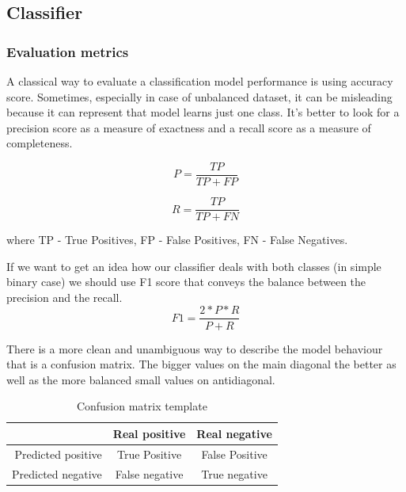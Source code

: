 \documentclass[11pt]{article}
\begin{document}
\subsection{Classifier}
\label{subsec:classifying2}

\subsubsection{Evaluation metrics}

A classical way to evaluate a classification model performance is using accuracy score. Sometimes, especially in case of unbalanced dataset, it can be misleading because it can represent that model learns just one class. It’s better to look for a precision score as a measure of exactness and a recall score as a measure of completeness.

\begin{equation}
P = \frac{TP}{TP+FP} 
\end{equation}

\begin{equation}
R = \frac{TP}{TP+FN}
\end{equation}

where TP - True Positives, FP - False Positives, FN - False Negatives.

If we want to get an idea how our classifier deals with both classes (in simple binary case) we should use F1 score that conveys the balance between the precision and the recall.
\begin{equation}
F1 = \frac{2*P*R}{P+R}
\end{equation}

    There is a more clean and unambiguous way to describe the model behaviour that is a confusion matrix. The bigger values on the main diagonal the better as well as the more balanced small values on antidiagonal.

\begin{table}[htb]
\begin{center}
\begin{tabular}{ |r|c|c| }
\hline
& Real positive & Real negative \\ \hline
Predicted positive & True Positive 	& False Positive \\ \hline
Predicted negative & False negative & True negative \\ \hline
\end{tabular}
\caption{Confusion matrix template}
\end{center}
\end{table}
\FloatBarrier
\end{document}
